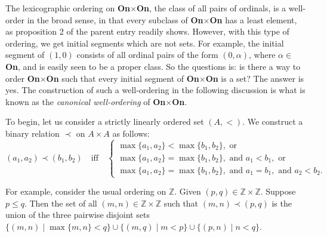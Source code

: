 \documentclass[12pt]{article}
\begin{document}
The lexicographic ordering on \textbf{On}$\times$\textbf{On}, the class of all pairs of ordinals, is a well-order in the broad sense, in that every subclass of \textbf{On}$\times$\textbf{On} has a least element, as proposition 2 of the parent entry readily shows.  However, with this type of ordering, we get initial segments which are not sets.  For example, the initial segment of $(1,0)$ consists of all ordinal pairs of the form $(0,\alpha)$, where $\alpha\in$ \textbf{On}, and is easily seen to be a proper class.  So the questions is: is there a way to order \textbf{On}$\times$\textbf{On} such that every initial segment of \textbf{On}$\times$\textbf{On} is a set?  The answer is yes.  The construction of such a well-ordering in the following discussion is what is known as the \emph{canonical well-ordering} of \textbf{On}$\times$\textbf{On}.

To begin, let us consider a strictly linearly ordered set $(A,<)$.  We construct a binary relation $\prec$ on $A\times A$ as follows:
\begin{displaymath}
(a_1,a_2) \prec (b_1,b_2) \quad \mbox{iff} \quad \left\{
\begin{array}{ll}
\max \lbrace a_1,a_2\rbrace < \max \lbrace b_1, b_2\rbrace, \mbox{ or }\\
\max \lbrace a_1,a_2\rbrace = \max \lbrace b_1, b_2\rbrace, \mbox{ and } a_1 < b_1, \mbox{ or } \\
\max \lbrace a_1,a_2\rbrace = \max \lbrace b_1, b_2\rbrace, \mbox{ and } a_1 = b_1, \mbox{ and } a_2 < b_2.
\end{array}
\right.
\end{displaymath}

For example, consider the usual ordering on $\mathbb{Z}$.  Given $(p,q)\in \mathbb{Z}\times \mathbb{Z}$.  Suppose $p\le q$.  Then the set of all $(m,n) \in \mathbb{Z}\times \mathbb{Z}$ such that $(m,n)\prec (p,q)$ is the union of the three pairwise disjoint sets $\lbrace (m,n)\mid \max\lbrace m,n\rbrace < q\rbrace \cup \lbrace (m,q)\mid m < p \rbrace \cup \lbrace (p,n)\mid n < q\rbrace$.
\end{document}
